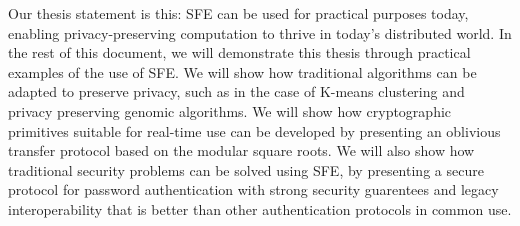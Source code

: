 Our thesis statement is this:  SFE can be used for practical purposes today,
enabling privacy-preserving computation to thrive in today's distributed
world. In the rest of this document, we will demonstrate this thesis through
practical examples of the use of SFE.  We will show how traditional algorithms
can be adapted to preserve privacy, such as in the case of K-means clustering
and privacy preserving genomic algorithms.  We will show how cryptographic
primitives suitable for real-time use can be developed by presenting an
oblivious transfer protocol based on the modular square roots.  We will
also show how traditional security problems can be solved using SFE,
by presenting a secure protocol for password authentication with strong
security guarentees and legacy interoperability that is better than other
authentication protocols in common use.

